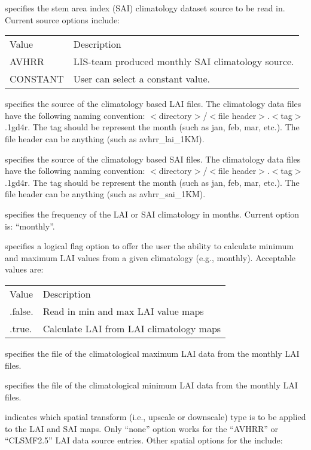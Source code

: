  specifies the stem area index (SAI)
 climatology dataset source to be read in. Current source options include:

 \begin{tabular}{ll}
 Value      & Description    \\
 AVHRR       &  LIS-team produced monthly SAI climatology source. \\
 CONSTANT    &   User can select a constant value. \\
 \end{tabular}

  specifies the source of the climatology based
 LAI files. The climatology data files have the following
 naming convention: $<$directory$>$/$<$file header$>$.$<$tag$>$.1gd4r.
 The tag should be represent the month (such as jan, feb, mar, etc.).
 The file header can be anything (such as avhrr\_lai\_1KM).

  specifies the source of the climatology based
 SAI files. The climatology data files have the following
 naming convention: $<$directory$>$/$<$file header$>$.$<$tag$>$.1gd4r.
 The tag should be represent the month (such as jan, feb, mar, etc.).
 The file header can be anything (such as avhrr\_sai\_1KM).

  specifies the frequency of the
 LAI or SAI climatology in months. Current option is:  ``monthly''.

  specifies a
 logical flag option to offer the user the ability to calculate
 minimum and maximum LAI values from a given climatology (e.g., monthly).
 Acceptable values are:

 \begin{tabular}{ll}
 Value     & Description                                \\
 .false.   & Read in min and max LAI value maps         \\
 .true.    & Calculate LAI from LAI climatology maps    \\
 \end{tabular}

  specifies the file of the
 climatological maximum LAI data from the monthly
 LAI files.

  specifies the file of the
 climatological minimum LAI data from the monthly
 LAI files.

  indicates which spatial transform
 (i.e., upscale or downscale) type is to be applied to the LAI and SAI
 maps.  Only ``none'' option works for the ``AVHRR'' or ``CLSMF2.5'' 
 LAI data source entries.  Other spatial options for the include:

